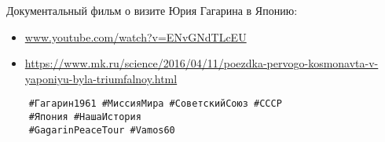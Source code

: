 Документальный фильм о визите Юрия Гагарина в Японию: 

\begin{itemize}
\item \url{www.youtube.com/watch?v=ENvGNdTLcEU} 
\item \url{https://www.mk.ru/science/2016/04/11/poezdka-pervogo-kosmonavta-v-yaponiyu-byla-triumfalnoy.html}
\end{itemize}

\begin{verbatim}
	#Гагарин1961 #МиссияМира #СоветскийСоюз #СССР 
	#Япония #НашаИстория 
	#GagarinPeaceTour #Vamos60
\end{verbatim}
